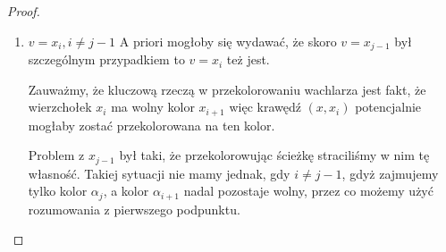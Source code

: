 \begin{proof}
\begin{enumerate}
		\item $v = x_i, i \neq j - 1$
		      A priori mogłoby się wydawać, że skoro $v = x_{j-1}$ był szczególnym przypadkiem to $v = x_i$ też jest.

		      Zauważmy, że kluczową rzeczą w przekolorowaniu
		      wachlarza jest fakt, że wierzchołek $x_i$ ma wolny kolor $x_{i+1}$ więc krawędź $(x, x_i)$ potencjalnie mogłaby zostać przekolorowana na ten kolor.

		      Problem z $x_{j-1}$ był taki, że przekolorowując ścieżkę straciliśmy w nim tę własność.
		      Takiej sytuacji nie mamy jednak, gdy $i \neq j - 1$, gdyż zajmujemy tylko kolor $\alpha_j$, a kolor $\alpha_{i+1}$ nadal pozostaje wolny, przez co możemy użyć rozumowania z pierwszego podpunktu.

	\end{enumerate}



\end{proof}